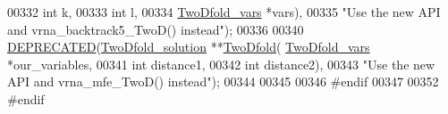 \begin{DoxyCode}
00332                                        \textcolor{keywordtype}{int}            k,
00333                                        \textcolor{keywordtype}{int}            l,
00334                                        \mbox{\hyperlink{group__kl__neighborhood__mfe_struct_two_dfold__vars}{TwoDfold\_vars}}  *vars),
00335           \textcolor{stringliteral}{"Use the new API and vrna\_backtrack5\_TwoD() instead"});
00336 
00340 \mbox{\hyperlink{2_dfold_8h_aab347a3c03fbe8e7319551b9fa0cce4a}{DEPRECATED}}(\mbox{\hyperlink{group__kl__neighborhood__mfe_ga09e71024abb1a2bd19d9137596376e15}{TwoDfold\_solution}} **\mbox{\hyperlink{group__kl__neighborhood__mfe_ga9827e1deba983a95d0509d36b61fb0e2}{TwoDfold}}(
      \mbox{\hyperlink{group__kl__neighborhood__mfe_struct_two_dfold__vars}{TwoDfold\_vars}} *our\_variables,
00341                                         \textcolor{keywordtype}{int}           distance1,
00342                                         \textcolor{keywordtype}{int}           distance2),
00343           \textcolor{stringliteral}{"Use the new API and vrna\_mfe\_TwoD() instead"});
00344 
00345 
00346 \textcolor{preprocessor}{#endif}
00347 
00352 \textcolor{preprocessor}{#endif}
\end{DoxyCode}
